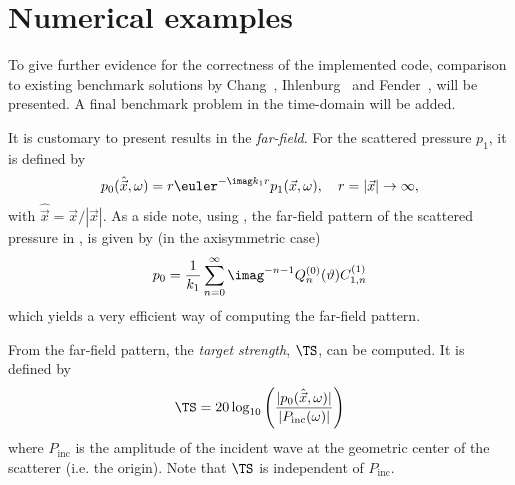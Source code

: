 \section{Numerical examples} 
\label{Sec1:resultsDisc}
To give further evidence for the correctness of the implemented code, comparison to existing benchmark solutions by Chang~\cite{Chang1994soa}, Ihlenburg~\cite{Ihlenburg1998fea} and Fender~\cite{Fender1972sfa}, will be presented. A final benchmark problem in the time-domain will be added.

It is customary to present results in the \textit{far-field}. For the scattered pressure $p_1$, it is defined by
\begin{equation}
	p_0(\hat{\vec{x}},\omega) =  r \euler^{-\imag k_1 r}p_1(\vec{x},\omega),\quad r = |\vec{x}| \to \infty,
\end{equation}
with $\hat{\vec{x}} = \vec{x}/|\vec{x}|$. As a side note, using , the far-field pattern of the scattered pressure in , is given by (in the axisymmetric case)
\begin{equation}
	p_0 = \frac{1}{k_1}\sum_{n=0}^\infty \imag^{-n-1} Q_n^{(0)}(\vartheta) C_{1,n}^{(1)}
\end{equation}
which yields a very efficient way of computing the far-field pattern.

From the far-field pattern, the \textit{target strength}, $\TS$, can be computed. It is defined by
\begin{equation}\label{Eq1:TS}
	\TS = 20\log_{10}\left(\frac{|p_0(\hat{\vec{x}},\omega)|}{|P_{\mathrm{inc}}(\omega)|}\right)
\end{equation}
where $P_{\mathrm{inc}}$ is the amplitude of the incident wave at the geometric center of the scatterer (i.e. the origin). Note that $\TS$ is independent of $P_{\mathrm{inc}}$.

